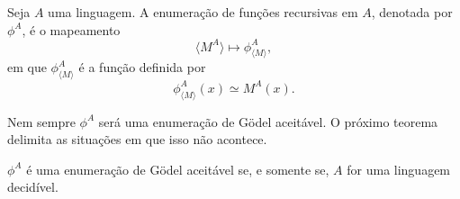 \begin{definition}
    Seja $A$ uma linguagem.
    A enumeração de funções recursivas em $A$,
    denotada por $\phi^A$,
    é o mapeamento
    \begin{equation*}
        \langle M^A \rangle \mapsto \phi^A_{\langle M \rangle},
    \end{equation*}
    em que $\phi^A_{\langle M \rangle}$
    é a função definida por
    \begin{equation*}
        \phi^A_{\langle M \rangle}(x) \simeq M^A(x).
    \end{equation*}
\end{definition}

Nem sempre $\phi^A$ será uma enumeração de Gödel aceitável.
O próximo teorema delimita as situações em que isso não acontece.

\begin{theorem}
    $\phi^A$ é uma enumeração de Gödel aceitável se,
    e somente se,
    $A$ for uma linguagem decidível.
\end{theorem}


